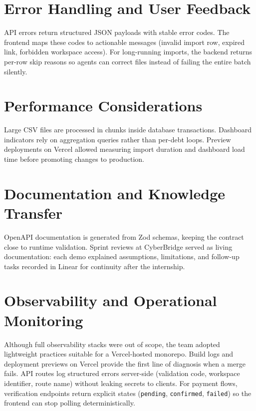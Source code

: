 \documentclass[12pt,a4paper]{report}
\begin{document}
\section{Error Handling and User Feedback}

API errors return structured JSON payloads with stable error codes.
The frontend maps these codes to actionable messages (invalid import row, expired
link, forbidden workspace access).
For long-running imports, the backend returns per-row skip reasons so agents can
correct files instead of failing the entire batch silently.

\section{Performance Considerations}

Large CSV files are processed in chunks inside database transactions.
Dashboard indicators rely on aggregation queries rather than per-debt loops.
Preview deployments on Vercel allowed measuring import duration and dashboard load
time before promoting changes to production.

\section{Documentation and Knowledge Transfer}

OpenAPI documentation is generated from Zod schemas, keeping the contract close to
runtime validation.
Sprint reviews at CyberBridge served as living documentation: each demo explained
assumptions, limitations, and follow-up tasks recorded in Linear for continuity after
the internship.

\section{Observability and Operational Monitoring}

Although full observability stacks were out of scope, the team adopted lightweight
practices suitable for a Vercel-hosted monorepo.
Build logs and deployment previews on Vercel provide the first line of diagnosis when
a merge fails.
API routes log structured errors server-side (validation code, workspace identifier,
route name) without leaking secrets to clients.
For payment flows, verification endpoints return explicit states (\texttt{pending},
\texttt{confirmed}, \texttt{failed}) so the frontend can stop polling
deterministically.
\end{document}
